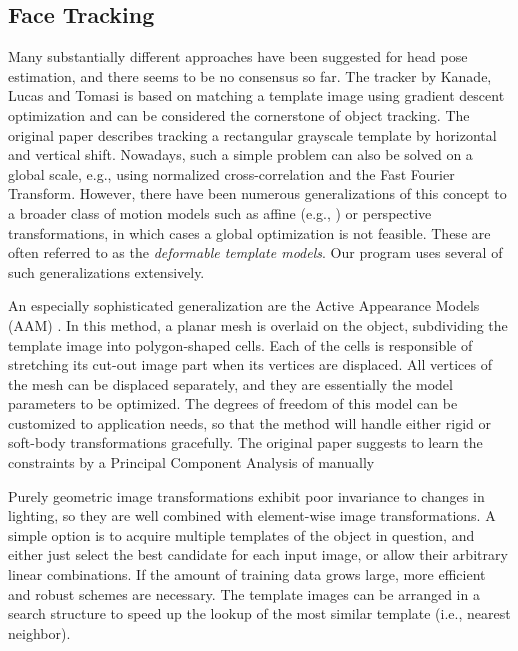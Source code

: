 \subsection{Face Tracking}

Many substantially different approaches have been suggested for head pose estimation, and there seems to be no consensus so far.
The tracker by Kanade, Lucas and Tomasi \cite{lucas81} is based on matching a template image using gradient descent optimization and can be considered the cornerstone of object tracking.
The original paper describes tracking a rectangular grayscale template by horizontal and vertical shift.
Nowadays, such a simple problem can also be solved on a global scale, e.g., using normalized cross-correlation and the Fast Fourier Transform.
However, there have been numerous generalizations of this concept to a broader class of motion models such as affine (e.g., \cite{bouguet01}) or perspective transformations, in which cases a global optimization is not feasible.
These are often referred to as the \textit{deformable template models}.
Our program uses several of such generalizations extensively.

An especially sophisticated generalization are the Active Appearance Models (AAM) \cite{cootes01,stegmann00}.
In this method, a planar mesh is overlaid on the object, subdividing the template image into polygon-shaped cells.
Each of the cells is responsible of stretching its cut-out image part when its vertices are displaced.
All vertices of the mesh can be displaced separately, and they are essentially the model parameters to be optimized.
The degrees of freedom of this model can be customized to application needs, so that the method will handle either rigid or soft-body transformations gracefully.
The original paper suggests to learn the constraints by a Principal Component Analysis of manually 

Purely geometric image transformations exhibit poor invariance to changes in lighting, so they are well combined with element-wise image transformations.
A simple option is to acquire multiple templates of the object in question, and either just select the best candidate for each input image, or allow their arbitrary linear combinations.
If the amount of training data grows large, more efficient and robust schemes are necessary.
The template images can be arranged in a search structure to speed up the lookup of the most similar template (i.e., nearest neighbor).


